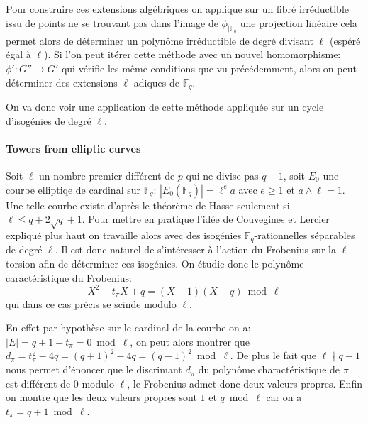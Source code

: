 \documentclass[10pt,a4paper]{book}
\theoremstyle{plain}
\theoremstyle{definition}
\theoremstyle{definition}
\theoremstyle{definition}
\theoremstyle{definition}
\theoremstyle{remark}
\theoremstyle{remark}
\begin{document}
Pour construire ces extensions algébriques on applique sur un fibré irréductible issu de points ne se trouvant pas dans l'image de $\phi_{\mid \mathbb{F}_q}$ une projection linéaire cela permet alors de  déterminer un polynôme irréductible de degré divisant $\ell$ (espéré égal à $\ell$). Si l'on peut itérer cette méthode avec un nouvel homomorphisme: $\phi':G'' \to G'$ qui vérifie les même conditions que vu précédemment, alors on peut déterminer des extensions $\ell$-adiques de $\mathbb{F}_q$.

On va donc voir une application de cette méthode appliquée sur un cycle d'isogénies de degré $\ell$.

\paragraph{Towers from elliptic curves}

Soit $\ell$ un nombre premier différent de $p$ qui ne divise pas $q-1$, soit $E_0$ une courbe elliptiqe de cardinal sur $\mathbb{F}_q$: $|E_0(\mathbb{F}_q)|=\ell^e a$ avec $e \geqslant 1$ et $a \wedge \ell =1$. Une telle courbe existe d'après le théorème de Hasse seulement si $\ell \leqslant q+2\sqrt{q} +1$.  
Pour mettre en pratique l'idée de Couvegines et Lercier \cite{couveignesLercier2013} expliqué plus haut on travaille alors avec des isogénies $\mathbb{F}_q$-rationnelles séparables de degré $\ell$. Il est donc naturel de s'intéresser à l'action du Frobenius sur la $\ell$ torsion afin de déterminer ces isogénies. On étudie donc le polynôme caractéristique du Frobenius:
\begin{equation*}
X^2-t_{\pi}X+q=(X-1)(X-q) \bmod \ell
\end{equation*}
qui dans ce cas précis se scinde modulo $\ell$.


En effet par hypothèse sur le cardinal de la courbe on a: $|E|=q+1-t_{\pi}=0 \bmod \ell$, on peut alors montrer que $d_{\pi}=t_{\pi}^2-4q=(q+1)^2-4q=(q-1)^2 \bmod \ell$. De plus le fait que $\ell \nmid q-1$ nous permet d'énoncer que le discrimant $d_{\pi}$ du polynôme charactéristique de $\pi$ est différent de $0$ modulo $\ell$, le Frobenius admet donc deux valeurs propres. Enfin on montre que les deux valeurs propres sont $1$ et $q \bmod \ell$ car on a $t_{\pi}=q+1 \bmod \ell$.
\end{document}
